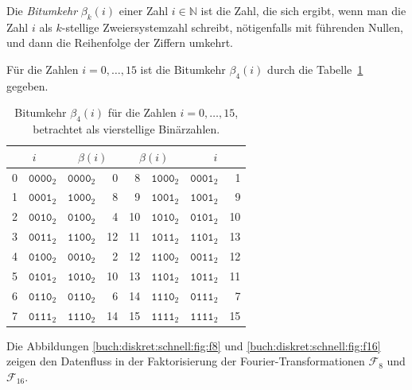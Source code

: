 \begin{definition}[Bitumkehr]
Die {\em Bitumkehr} $\beta_k(i)$ einer Zahl $i\in\mathbb{N}$ ist
%
die Zahl, die sich ergibt, wenn man die Zahl $i$ als $k$-stellige
Zweiersystemzahl schreibt, nötigenfalls mit führenden Nullen,  und
dann die Reihenfolge der Ziffern umkehrt.
\end{definition}

\begin{beispiel}
Für die Zahlen $i=0,\dots,15$  ist die Bitumkehr $\beta_4(i)$ durch
die Tabelle~\ref{buch:diskret:schnell:table:bitumkehr} gegeben.
\end{beispiel}

\begin{table}
\centering
\begin{tabular}{|r|r|r|r||r|r|r|r|}
\hline
\multicolumn{2}{|c|}{$i$}&
\multicolumn{2}{|c||}{$\beta(i)$}&
\multicolumn{2}{|c|}{$\beta(i)$}&
\multicolumn{2}{|c|}{$i$}
\\
\hline
0&$\texttt{0000}_2$&$\texttt{0000}_2$& 0& 8&$\texttt{1000}_2$&$\texttt{0001}_2$& 1\\
1&$\texttt{0001}_2$&$\texttt{1000}_2$& 8& 9&$\texttt{1001}_2$&$\texttt{1001}_2$& 9\\
2&$\texttt{0010}_2$&$\texttt{0100}_2$& 4&10&$\texttt{1010}_2$&$\texttt{0101}_2$&10\\
3&$\texttt{0011}_2$&$\texttt{1100}_2$&12&11&$\texttt{1011}_2$&$\texttt{1101}_2$&13\\
4&$\texttt{0100}_2$&$\texttt{0010}_2$& 2&12&$\texttt{1100}_2$&$\texttt{0011}_2$&12\\
5&$\texttt{0101}_2$&$\texttt{1010}_2$&10&13&$\texttt{1101}_2$&$\texttt{1011}_2$&11\\
6&$\texttt{0110}_2$&$\texttt{0110}_2$& 6&14&$\texttt{1110}_2$&$\texttt{0111}_2$& 7\\
7&$\texttt{0111}_2$&$\texttt{1110}_2$&14&15&$\texttt{1111}_2$&$\texttt{1111}_2$&15\\
\hline
\end{tabular}
\caption{Bitumkehr $\beta_4(i)$ für die Zahlen $i=0,\dots,15$, betrachtet
als vierstellige Binärzahlen.
\label{buch:diskret:schnell:table:bitumkehr}}
\end{table}

Die Abbildungen 
\ref{buch:diskret:schnell:fig:f8}
und
\ref{buch:diskret:schnell:fig:f16}
zeigen den Datenfluss in der Faktorisierung der
Fourier-Trans\-for\-ma\-tio\-nen
$\mathscr{F}_8$ und $\mathscr{F}_{16}$.



